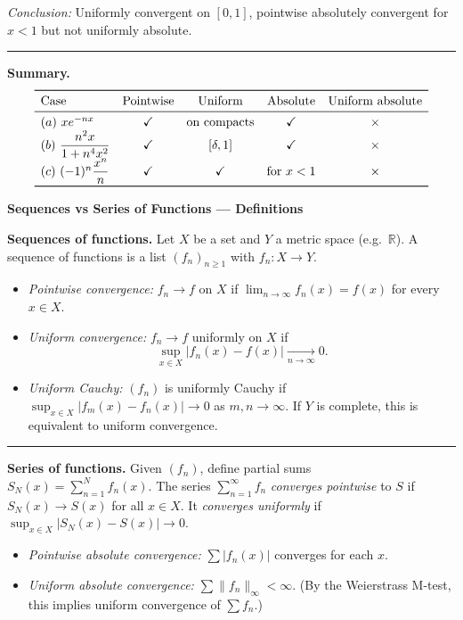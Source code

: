 \documentclass[12pt,a4paper]{article}
\theoremstyle{plain}
\theoremstyle{definition}
\theoremstyle{remark}
\theoremstyle{remark}
\newcommand{\probheader}[1]{%
	\par\vspace{8pt}%
	{\Large\bfseries #1\par}%
	\vspace{6pt}%
}
\newcommand{\sep}{\vspace{6pt}\hrule\vspace{8pt}}
\begin{document}
	\textit{Conclusion:}
	Uniformly convergent on $[0,1]$,
	pointwise absolutely convergent for $x<1$ but not uniformly absolute.
	
	\sep
	
	\textbf{Summary.}
	\[
	\begin{array}{lcccc}
		\toprule
		\text{Case} & \text{Pointwise} & \text{Uniform} & \text{Absolute} & \text{Uniform absolute}\\
		\midrule
		(a)~x e^{-nx} & \checkmark & \text{on compacts} & \checkmark & \times\\
		(b)~\dfrac{n^2x}{1+n^4x^2} & \checkmark & [\delta,1] & \checkmark & \times\\
		(c)~(-1)^n\dfrac{x^n}{n} & \checkmark & \checkmark & \text{for }x<1 & \times\\
		\bottomrule
	\end{array}
	\]
	
	\probheader{Sequences vs Series of Functions — Definitions}
	
	\textbf{Sequences of functions.}
	Let $X$ be a set and $Y$ a metric space (e.g.\ $\mathbb{R}$). A sequence of functions is a list
	$(f_n)_{n\ge1}$ with $f_n:X\to Y$.
	
	\begin{itemize}
		\item \emph{Pointwise convergence:} $f_n\to f$ on $X$ if $\lim_{n\to\infty} f_n(x)=f(x)$ for every $x\in X$.
		\item \emph{Uniform convergence:} $f_n\to f$ uniformly on $X$ if
		\[
		\sup_{x\in X}|f_n(x)-f(x)|\xrightarrow[n\to\infty]{}0.
		\]
		\item \emph{Uniform Cauchy:} $(f_n)$ is uniformly Cauchy if
		$\sup_{x\in X}|f_m(x)-f_n(x)|\to0$ as $m,n\to\infty$.
		If $Y$ is complete, this is equivalent to uniform convergence.
	\end{itemize}
	
	\sep
	
	\textbf{Series of functions.}
	Given $(f_n)$, define partial sums $S_N(x)=\sum_{n=1}^N f_n(x)$.
	The series $\sum_{n=1}^\infty f_n$ \emph{converges pointwise} to $S$ if $S_N(x)\to S(x)$ for all $x\in X$.
	It \emph{converges uniformly} if $\sup_{x\in X}|S_N(x)-S(x)|\to0$.
	
	\begin{itemize}
		\item \emph{Pointwise absolute convergence:} $\sum |f_n(x)|$ converges for each $x$.
		\item \emph{Uniform absolute convergence:} $\sum \|f_n\|_\infty<\infty$.
		(By the Weierstrass M-test, this implies uniform convergence of $\sum f_n$.)
	\end{itemize}
	
\end{document}
